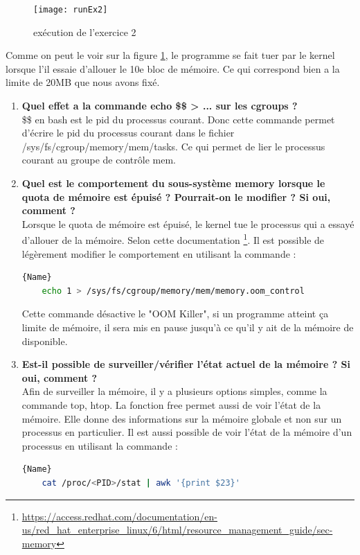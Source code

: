 \documentclass[
	a4paper, %
	10pt, %
]{CSUniSchoolLabReport}
\begin{document}
\begin{figure}[H]
	\centering
	\texttt{[image: runEx2]}
	\caption{ex\'ecution de l'exercice 2}
	\label{fig:ex2}
\end{figure}

Comme on peut le voir sur la figure \ref{fig:ex2}, le programme se fait tuer par le kernel lorsque l'il essaie d'allouer le 10e bloc de m\'emoire.
Ce qui correspond bien a la limite de 20MB que nous avons fixé.

\begin{enumerate}[label=\textbf{\arabic*}]
	\item \textbf{Quel effet a la commande echo \$\$ > ... sur les cgroups ?}\\
\$\$ en bash est le pid du processus courant. Donc cette commande permet d'écrire le pid du processus courant dans le fichier /sys/fs/cgroup/memory/mem/tasks. Ce qui permet de lier le processus courant au groupe de contr\^ole mem.
	
	\item \textbf{Quel est le comportement du sous-système memory lorsque le quota de mémoire est épuisé ? Pourrait-on le modifier ? Si oui, comment ?}\\
Lorsque le quota de m\'emoire est \'epuisé, le kernel tue le processus qui a essayé d'allouer de la m\'emoire.
Selon cette documentation \footnote{\href{https://access.redhat.com/documentation/en-us/red_hat_enterprise_linux/6/html/resource_management_guide/sec-memory}{https://access.redhat.com/documentation/en-us/red\_hat\_enterprise\_linux/6/html/resource\_management\_guide/sec-memory}}.
Il est possible de l\'eg\`erement modifier le comportement en utilisant la commande :
\begin{lstlisting}[language=bash, firstnumber=1]{Name}
	echo 1 > /sys/fs/cgroup/memory/mem/memory.oom_control
\end{lstlisting}
Cette commande d\'esactive le "OOM Killer", si un programme atteint ça limite de m\'emoire, il sera mis en pause jusqu'\`a ce qu'il y ait de la m\'emoire de disponible.

	\item \textbf{Est-il possible de surveiller/vérifier l’état actuel de la mémoire ? Si oui, comment ?}\\
Afin de surveiller la m\'emoire, il y a plusieurs options simples, comme la commande top, htop.
La fonction free permet aussi de voir l'\'etat de la m\'emoire. Elle donne des informations sur la m\'emoire globale et non sur un processus en particulier.
Il est aussi possible de voir l'\'etat de la m\'emoire d'un processus en utilisant la commande :
\begin{lstlisting}[language=bash, firstnumber=1]{Name}
	cat /proc/<PID>/stat | awk '{print $23}'
\end{lstlisting}
\end{enumerate}
\end{document}
